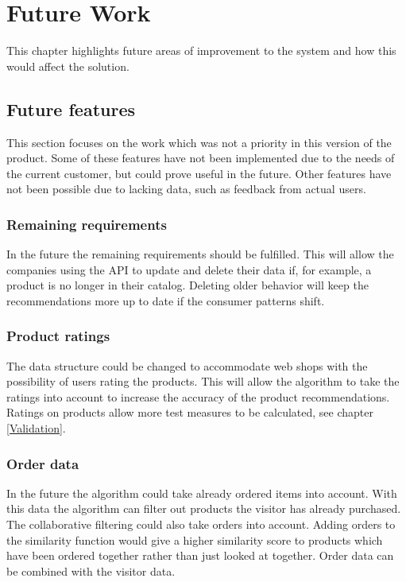 
\chapter{Future Work} %

\label{Chapter9} %

This chapter highlights future areas of improvement to the system and how this would affect the solution.

\section{Future features}
This section focuses on the work which was not a priority in this version of the product. Some of these features have not been implemented due to the needs of the current customer, but could prove useful in the future. Other features have not been possible due to lacking data, such as feedback from actual users.

\subsection{Remaining requirements}
In the future the remaining requirements should be fulfilled. This will allow the companies using the API to update and delete their data if, for example, a  product is no longer in their catalog. Deleting older behavior will keep the recommendations more up to date if the consumer patterns shift.

\subsection{Product ratings}
The data structure could be changed to accommodate web shops with the possibility of users rating the products. This will allow the algorithm to take the ratings into account to increase the accuracy of the product recommendations. Ratings on products allow more test measures to be calculated, see chapter \ref{Validation}.

\subsection{Order data}
In the future the algorithm could take already ordered items into account. With this data the algorithm can filter out products the visitor has already purchased. The collaborative filtering could also take orders into account. Adding orders to the similarity function would give a higher similarity score to products which have been ordered together rather than just looked at together. Order data can be combined with the visitor data.

